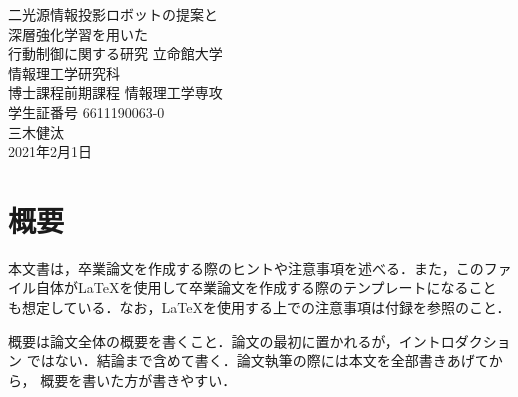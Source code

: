 \documentclass[12pt]{sonota/aislab}
\begin{document}

\begin{titlepage}
\centering
\vspace*{3truecm}
\Huge


二光源情報投影ロボットの提案と\\
深層強化学習を用いた\\
行動制御に関する研究
\vfill
\Large
立命館大学\\
情報理工学研究科\\
博士課程前期課程 情報理工学専攻\\[1zh]
学生証番号 6611190063-0\\[0.5zh]
{\LARGE{三木健汰}}\\[2zh]
2021年2月1日
\end{titlepage}


\let\cleardoublepage\clearpage

\frontmatter

\clearpage
{}
\chapter*{概要}
本文書は，卒業論文を作成する際のヒントや注意事項を述べる．また，このファ
イル自体が{\LaTeX}を使用して卒業論文を作成する際のテンプレートになること
も想定している．なお，{\LaTeX}を使用する上での注意事項は付録を参照のこと．

概要は論文全体の概要を書くこと．論文の最初に置かれるが，イントロダクション
ではない．結論まで含めて書く．論文執筆の際には本文を全部書きあげてから，
概要を書いた方が書きやすい．

\clearpage
{}
\bgroup

\tableofcontents
\clearpage
{}
\listoffigures 
\clearpage
{}
\listoftables
\end{document}
